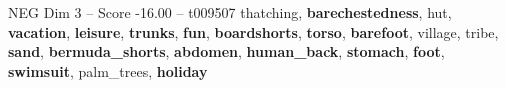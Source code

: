 \begin{textsample}{NEG Dim 3 – Score -16.00 – t009507}  \label{ex:f3_neg_023}
thatching, \textbf{barechestedness}, hut, \textbf{vacation}, \textbf{leisure}, \textbf{trunks}, \textbf{fun}, \textbf{boardshorts}, \textbf{torso}, \textbf{barefoot}, village, tribe, \textbf{sand}, \textbf{bermuda\_shorts}, \textbf{abdomen}, \textbf{human\_back}, \textbf{stomach}, \textbf{foot}, \textbf{swimsuit}, palm\_trees, \textbf{holiday}

\end{textsample}
